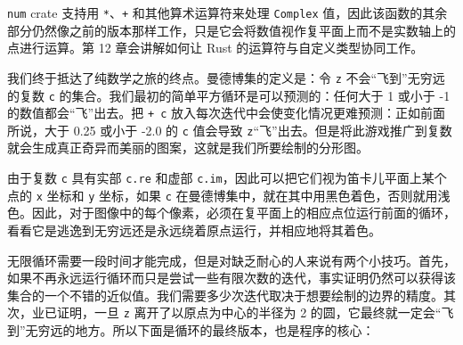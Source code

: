 \texttt{num} crate 支持用 \texttt{*}、\texttt{+} 和其他算术运算符来处理 \texttt{Complex} 值，因此该函数的其余部分仍然像之前的版本那样工作，只是它会将数值视作复平面上而不是实数轴上的点进行运算。第 12 章会讲解如何让 Rust 的运算符与自定义类型协同工作。

我们终于抵达了纯数学之旅的终点。曼德博集的定义是：令 \texttt{z} 不会“飞到”无穷远的复数 \texttt{c} 的集合。我们最初的简单平方循环是可以预测的：任何大于 1 或小于 -1 的数值都会“飞”出去。把 \texttt{+ c} 放入每次迭代中会使变化情况更难预测：正如前面所说，大于 0.25 或小于 -2.0 的 \texttt{c} 值会导致 \texttt{z}“飞”出去。但是将此游戏推广到复数就会生成真正奇异而美丽的图案，这就是我们所要绘制的分形图。

由于复数 \texttt{c} 具有实部 \texttt{c.re} 和虚部 \texttt{c.im}，因此可以把它们视为笛卡儿平面上某个点的 \texttt{x} 坐标和 \texttt{y} 坐标，如果 \texttt{c} 在曼德博集中，就在其中用黑色着色，否则就用浅色。因此，对于图像中的每个像素，必须在复平面上的相应点位运行前面的循环，看看它是逃逸到无穷远还是永远绕着原点运行，并相应地将其着色。

无限循环需要一段时间才能完成，但是对缺乏耐心的人来说有两个小技巧。首先，如果不再永远运行循环而只是尝试一些有限次数的迭代，事实证明仍然可以获得该集合的一个不错的近似值。我们需要多少次迭代取决于想要绘制的边界的精度。其次，业已证明，一旦 \texttt{z} 离开了以原点为中心的半径为 2 的圆，它最终就一定会“飞到”无穷远的地方。所以下面是循环的最终版本，也是程序的核心：

